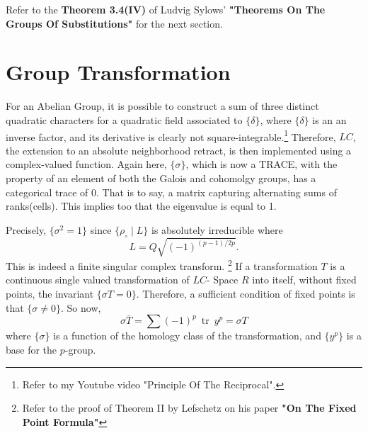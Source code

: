 \documentclass[11pt,fancy]{elegantbook}
\begin{document}
\begin{remark}
Refer to the \textbf{Theorem 3.4(IV)} of Ludvig Sylows' \textbf{"Theorems On The Groups Of Substitutions"} for the next section. 
\end{remark}


\section{Group Transformation}
For an Abelian Group, it is possible to construct a sum of three distinct quadratic characters for a quadratic field associated to $\{\delta\}$, where $\{\delta\}$ is an an inverse factor, and its derivative is clearly not square-integrable.\footnote{Refer to my Youtube video "Principle Of The Reciprocal".}
Therefore, $LC$, the extension to an absolute neighborhood retract, is then implemented using a complex-valued function. Again here, $\{\sigma\}$, which is now a TRACE, with the property of an element of both the Galois and cohomolgy groups, has a categorical trace of 0. That is to say, a matrix capturing alternating sums of ranks(cells). This implies too that the eigenvalue is equal to 1. 

Precisely, $\{\sigma^2=1\}$ since $\{\rho_\circ\mid{L}\}$ is absolutely irreducible where
\begin{equation}
L = Q\sqrt{(-1)^{(p-1)/{2p}}}.
\end{equation}
This is indeed a finite singular complex transform. \footnote{Refer to the proof of Theorem II by Lefschetz on his paper \textbf{"On The Fixed Point Formula"}}
If a transformation $T$ is a continuous single valued transformation of $LC$- Space $R$ into itself, without fixed points, the invariant $\{\sigma{T}= 0\}$.
Therefore, a sufficient condition of fixed points is that $\{\sigma\neq0\}$. So now,
\begin{equation}
\sigma{\overline{T}} = \sum(-1)^{p} \ \operatorname{tr} \ {y^p} = \sigma{T}
\end{equation}
where $\{\sigma\}$ is a function of the homology class of the transformation, and $\{y^p\}$ is a base for the $p$-group.
\end{document}
